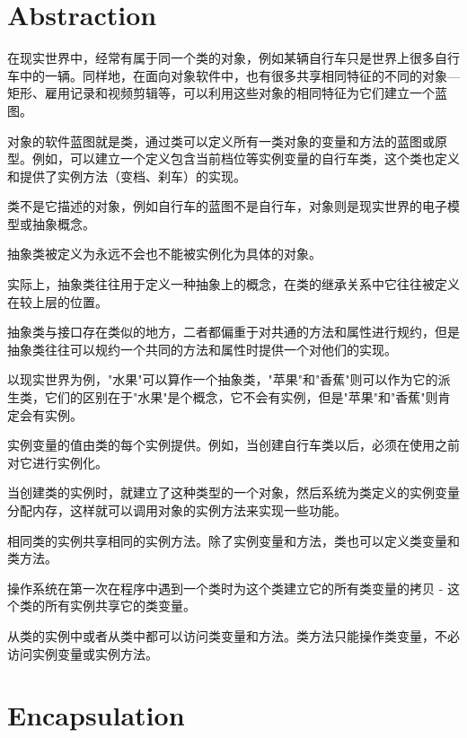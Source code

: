 \section{Abstraction}


在现实世界中，经常有属于同一个类的对象，例如某辆自行车只是世界上很多自行车中的一辆。同样地，在面向对象软件中，也有很多共享相同特征的不同的对象—矩形、雇用记录和视频剪辑等，可以利用这些对象的相同特征为它们建立一个蓝图。

对象的软件蓝图就是类，通过类可以定义所有一类对象的变量和方法的蓝图或原型。例如，可以建立一个定义包含当前档位等实例变量的自行车类，这个类也定义和提供了实例方法（变档、刹车）的实现。

\begin{compactitem}
\item 类不是它描述的对象，例如自行车的蓝图不是自行车，对象则是现实世界的电子模型或抽象概念。
\item 抽象类被定义为永远不会也不能被实例化为具体的对象。
\end{compactitem}

实际上，抽象类往往用于定义一种抽象上的概念，在类的继承关系中它往往被定义在较上层的位置。

抽象类与接口存在类似的地方，二者都偏重于对共通的方法和属性进行规约，但是抽象类往往可以规约一个共同的方法和属性时提供一个对他们的实现。

以现实世界为例，"水果"可以算作一个抽象类，"苹果"和"香蕉"则可以作为它的派生类，它们的区别在于"水果"是个概念，它不会有实例，但是"苹果"和"香蕉"则肯定会有实例。

实例变量的值由类的每个实例提供。例如，当创建自行车类以后，必须在使用之前对它进行实例化。



当创建类的实例时，就建立了这种类型的一个对象，然后系统为类定义的实例变量分配内存，这样就可以调用对象的实例方法来实现一些功能。

相同类的实例共享相同的实例方法。除了实例变量和方法，类也可以定义类变量和类方法。

操作系统在第一次在程序中遇到一个类时为这个类建立它的所有类变量的拷贝 - 这个类的所有实例共享它的类变量。


从类的实例中或者从类中都可以访问类变量和方法。类方法只能操作类变量，不必访问实例变量或实例方法。



\section{Encapsulation}

